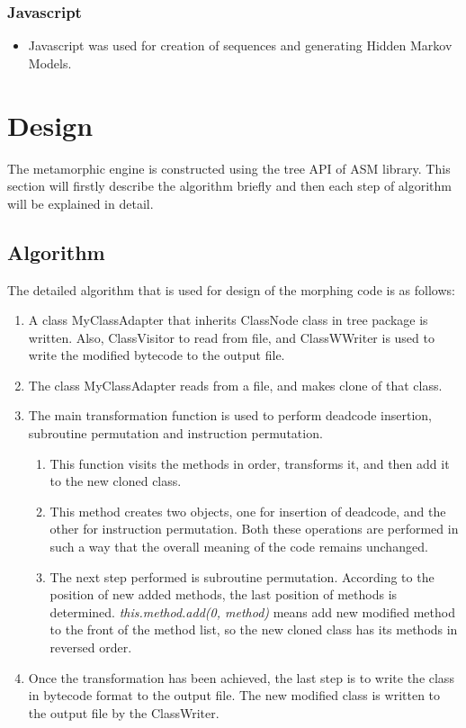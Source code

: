 \subsubsection{Javascript}
\begin{itemize}
\item Javascript was used for creation of sequences and generating Hidden Markov Models.
\end{itemize}

\section{Design}
The metamorphic engine is constructed using the tree API of ASM library. This section will firstly describe the algorithm briefly and then each step of algorithm will be explained in detail. 

\subsection{Algorithm}
The detailed algorithm that is used for design of the morphing code is as follows:
\begin{enumerate}
\item A class MyClassAdapter that inherits ClassNode class in tree package is written. Also, ClassVisitor to read from file, and ClassWWriter is used to write the modified bytecode to the output file.
\item The class MyClassAdapter reads from a file, and makes clone of that class.
\item The main transformation function is used to perform deadcode insertion, subroutine permutation and instruction permutation. 
\begin{enumerate}
\item This function visits the methods in order, transforms it, and then add it to the new cloned class.
\item This method creates two objects, one for insertion of deadcode, and the other for instruction 
permutation. Both these operations are performed in such a way that the overall meaning of the code remains unchanged.
\item The next step performed is subroutine permutation. According to the position of new added methods, the last position of methods is determined. \textit{this.method.add(0, method)} means add new modified method to the front of the method list, so the new cloned class has its methods in reversed order.
\end{enumerate}
\item Once the transformation has been achieved, the last step is to write the class in bytecode format to the output file. The new modified class is written to the output file by the ClassWriter.
\end{enumerate}


